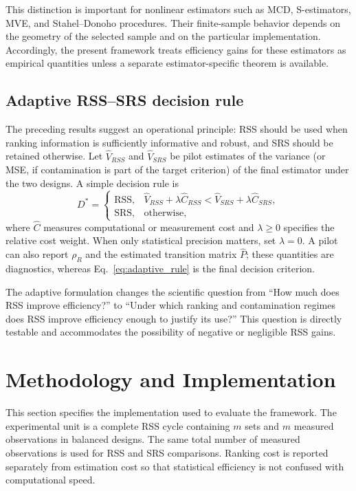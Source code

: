 \documentclass[12pt]{article}
\begin{document}
This distinction is important for nonlinear estimators such as MCD, S-estimators, MVE, and Stahel--Donoho procedures. Their finite-sample behavior depends on the geometry of the selected sample and on the particular implementation. Accordingly, the present framework treats efficiency gains for these estimators as empirical quantities unless a separate estimator-specific theorem is available.

\subsection{Adaptive RSS--SRS decision rule}
The preceding results suggest an operational principle: RSS should be used when ranking information is sufficiently informative and robust, and SRS should be retained otherwise. Let $\widehat V_{RSS}$ and $\widehat V_{SRS}$ be pilot estimates of the variance (or MSE, if contamination is part of the target criterion) of the final estimator under the two designs. A simple decision rule is
\begin{equation}
\label{eq:adaptive_rule}
D^*=\begin{cases}
\mathrm{RSS}, & \widehat V_{RSS}+\lambda\widehat C_{RSS}
<\widehat V_{SRS}+\lambda\widehat C_{SRS},\\
\mathrm{SRS}, & \text{otherwise},
\end{cases}
\end{equation}
where $\widehat C$ measures computational or measurement cost and $\lambda\geq0$ specifies the relative cost weight. When only statistical precision matters, set $\lambda=0$. A pilot can also report $\rho_R$ and the estimated transition matrix $\widehat P$; these quantities are diagnostics, whereas Eq.~\eqref{eq:adaptive_rule} is the final decision criterion.

The adaptive formulation changes the scientific question from ``How much does RSS improve efficiency?'' to ``Under which ranking and contamination regimes does RSS improve efficiency enough to justify its use?'' This question is directly testable and accommodates the possibility of negative or negligible RSS gains.

\section{Methodology and Implementation}
\label{sec:methodology}

This section specifies the implementation used to evaluate the framework. The experimental unit is a complete RSS cycle containing $m$ sets and $m$ measured observations in balanced designs. The same total number of measured observations is used for RSS and SRS comparisons. Ranking cost is reported separately from estimation cost so that statistical efficiency is not confused with computational speed.
\end{document}
